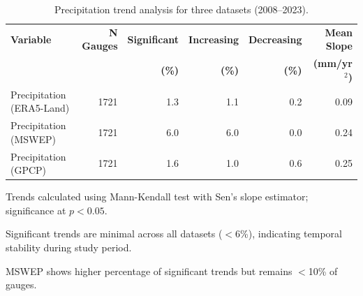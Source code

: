 \begin{table}[htbp]
\centering
\caption{Precipitation trend analysis for three datasets (2008--2023).}
\label{tab:precipitation_trends}
\begin{tabular}{lrrrrr}
\toprule
\textbf{Variable} & \textbf{N Gauges} & \textbf{Significant} & \textbf{Increasing} & \textbf{Decreasing} & \textbf{Mean Slope} \\
 & & \textbf{(\%)} & \textbf{(\%)} & \textbf{(\%)} & \textbf{(mm/yr$^2$)} \\
\midrule
Precipitation (ERA5-Land) & 1721 & 1.3 & 1.1 & 0.2 & 0.09 \\
Precipitation (MSWEP) & 1721 & 6.0 & 6.0 & 0.0 & 0.24 \\
Precipitation (GPCP) & 1721 & 1.6 & 1.0 & 0.6 & 0.25 \\
\bottomrule
\end{tabular}
\begin{tablenotes}
\small
\item Trends calculated using Mann-Kendall test with Sen's slope estimator; significance at $p < 0.05$.
\item Significant trends are minimal across all datasets ($<$6\%), indicating temporal stability during study period.
\item MSWEP shows higher percentage of significant trends but remains $<$10\% of gauges.
\end{tablenotes}
\end{table}
